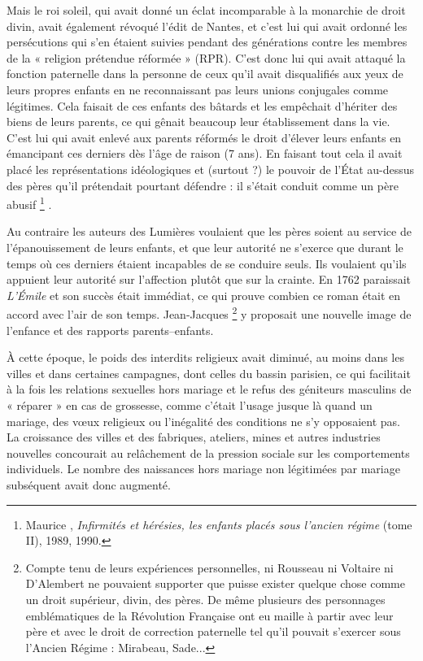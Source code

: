  Mais le roi soleil, qui avait donné un éclat incomparable à la monarchie de droit divin, avait également révoqué l'édit de Nantes, et c'est lui qui avait ordonné les persécutions qui s'en étaient suivies pendant des générations contre les membres de la « {religion prétendue réformée} » (RPR). C'est donc lui qui avait attaqué la fonction paternelle dans la personne de ceux qu'il avait disqualifiés aux yeux de leurs propres enfants en ne reconnaissant pas leurs unions conjugales comme légitimes. Cela faisait de ces enfants des bâtards et les empêchait d'hériter des biens de leurs parents, ce qui gênait beaucoup leur établissement dans la vie. C'est lui qui avait enlevé aux parents réformés le droit d'élever leurs enfants en émancipant ces derniers dès l'âge de raison (7 ans). En faisant tout cela il avait placé les représentations idéologiques et (surtout ?) le pouvoir de l'État au-dessus des pères qu'il prétendait pourtant défendre : il s'était conduit comme un père abusif%
\footnote{Maurice , \emph{Infirmités et hérésies, les enfants placés sous l'ancien régime} (tome II), 1989, 1990.}%
.


 Au contraire les auteurs des Lumières voulaient que les pères soient au service de l'épanouissement de leurs enfants, et que leur autorité ne s'exerce que durant le temps où ces derniers étaient incapables de se conduire seuls. Ils voulaient qu'ils appuient leur autorité sur l'affection plutôt que sur la crainte. En 1762 paraissait \emph{L'Émile} et son succès était immédiat, ce qui prouve combien ce roman était en accord avec l'air de son temps. Jean-Jacques %
\footnote{Compte tenu de leurs expériences personnelles, ni Rousseau ni Voltaire ni D'Alembert ne pouvaient supporter que puisse exister quelque chose comme un droit supérieur, divin, des pères. De même plusieurs des personnages emblématiques de la Révolution Française ont eu maille à partir avec leur père et avec le droit de correction paternelle tel qu'il pouvait s'exercer sous l'Ancien Régime : Mirabeau, Sade...} 
y proposait une nouvelle image de l'enfance et des rapports parents--enfants. 

 




 À cette époque, le poids des interdits religieux avait diminué, au moins dans les villes et dans certaines campagnes, dont celles du bassin parisien, ce qui facilitait à la fois les relations sexuelles hors mariage et le refus des géniteurs masculins de « réparer » en cas de grossesse, comme c'était l'usage jusque là quand un mariage, des vœux religieux ou l'inégalité des conditions ne s'y opposaient pas. La croissance des villes et des fabriques, ateliers, mines et autres industries nouvelles concourait au relâchement de la pression sociale sur les comportements individuels. Le nombre des naissances hors mariage non légitimées par mariage subséquent avait donc augmenté. 

